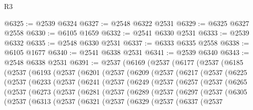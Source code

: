 \begin{lexlean}{R3}
\begin{coremodule}
@6325 := @2539 @6324
@6327 := @2548 @6322 @2531
@6329 := @6325 @6327 @2558
@6330 := @6105 @1659
@6332 := @2541 @6330 @2531
@6333 := @2539 @6332
@6335 := @2548 @6330 @2531
@6337 := @6333 @6335 @2558
@6338 := @6105 @1677
@6340 := @2541 @6338 @2531
@6341 := @2539 @6340
@6343 := @2548 @6338 @2531
@6391 := @2537
    (@6169
      (@2537
        (@6177
          (@2537
            (@6185
              (@2537
                (@6193
                  (@2537
                    (@6201
                      (@2537
                        (@6209
                          (@2537
                            (@6217
                              (@2537
                                (@6225
                                  (@2537
                                    (@6233
                                      (@2537
                                        (@6241
                                          (@2537
                                            (@6249
                                              (@2537
                                                (@6257
                                                  (@2537
                                                    (@6265
                                                      (@2537
                                                        (@6273
                                                          (@2537
                                                            (@6281
                                                              (@2537
                                                                (@6289
                                                                  (@2537
                                                                    (@6297
                                                                      (@2537
                                                                        (@6305
                                                                          (@2537
                                                                            (@6313
                                                                              (@2537
                                                                                (@6321
                                                                                  (@2537
                                                                                    (@6329
                                                                                      (@2537
                                                                                        (@6337
                                                                                          (@2537

\end{coremodule}
\end{lexlean}
